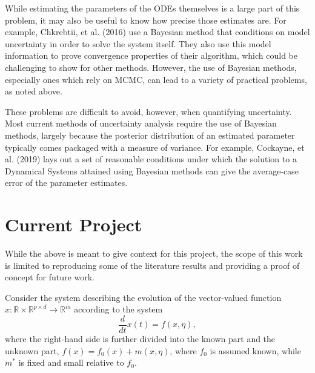 \documentclass[12pt]{article}
\begin{document}
While estimating the parameters of the ODEs themselves is a large part of this problem, it may also be useful to know how precise those estimates are. For example, Chkrebtii, et al. (2016) use a Bayesian method that conditions on model uncertainty in order to solve the system itself. They also use this model information to prove convergence properties of their algorithm, which could be challenging to show for other methods.\cite{chkrebtii} However, the use of Bayesian methods, especially ones which rely on MCMC, can lead to a variety of practical problems, as noted above.

These problems are difficult to avoid, however, when quantifying uncertainty. Most current methods of uncertainty analysis require the use of Bayesian methods, largely because the posterior distribution of an estimated parameter typically comes packaged with a measure of variance. For example, Cockayne, et al. (2019) lays out a set of reasonable conditions under which the solution to a Dynamical Systems attained using Bayesian methods can give the average-case error of the parameter estimates.\cite{cockayne}


\section{Current Project}



While the above is meant to give context for this project, the scope of this work is limited to reproducing some of the literature results and providing a proof of concept for future work.

Consider the system describing the evolution of the vector-valued function $x: \mathbb{R} \times \mathbb{R}^{p \times d} \to \mathbb{R}^m$ according to the system $$\frac{d}{d t}x(t) = f(x,\eta),$$ where the right-hand side is further divided into the known part and the unknown part, $f(x) = f_0(x) + m(x, \eta)$, where $f_0$ is assumed known, while $m^*$ is fixed and small relative to $f_0$.
\end{document}
